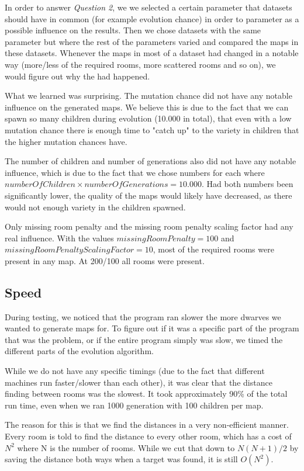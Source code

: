 In order to answer \textit{Question 2}, we we selected a certain parameter that datasets should have in common (for example evolution chance) in order to parameter as a possible influence on the results. Then we chose datasets with the same parameter but where the rest of the parameters varied and compared the maps in these datasets. Whenever the maps in most of a dataset had changed in a notable way (more/less of the required rooms, more scattered rooms and so on), we would figure out why the had happened.

What we learned was surprising. The mutation chance did not have any notable influence on the generated maps. We believe this is due to the fact that we can spawn so many children during evolution (10.000 in total), that even with a low mutation chance there is enough time to "catch up" to the variety in children that the higher mutation chances have.

The number of children and number of generations also did not have any notable influence, which is due to the fact that we chose numbers for each where $numberOfChildren \times numberOfGenerations = 10.000$. Had both numbers been significantly lower, the quality of the maps would likely have decreased, as there would not enough variety in the children spawned.

Only missing room penalty and the missing room penalty scaling factor had any real influence. With the values $missingRoomPenalty = 100$ and $missingRoomPenaltyScalingFactor = 10$, most of the required rooms were present in any map. At 200/100 all rooms were present.

\subsection{Speed}

During testing, we noticed that the program ran slower the more dwarves we wanted to generate maps for. To figure out if it was a specific part of the program that was the problem, or if the entire program simply was slow, we timed the different parts of the evolution algorithm.

While we do not have any specific timings (due to the fact that different machines run faster/slower than each other), it was clear that the distance finding between rooms was the slowest. It took approximately 90\% of the total run time, even when we ran 1000 generation with 100 children per map.

The reason for this is that we find the distances in a very non-efficient manner. Every room is told to find the distance to every other room, which has a cost of $N^2$ where N is the number of rooms. While we cut that down to $N(N+1)/2$ by saving the distance both ways when a target was found, it is still $O(N^2)$.


